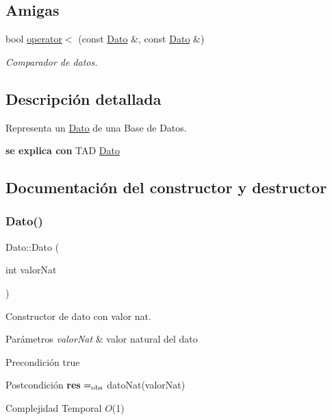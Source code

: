 \subsection*{Amigas}
\begin{DoxyCompactItemize}
\item 
\mbox{\label{classDato_a394289679728bdcb20171c43449894c1}} 
bool \mbox{\hyperlink{classDato_a394289679728bdcb20171c43449894c1}{operator$<$}} (const \mbox{\hyperlink{classDato}{Dato}} \&, const \mbox{\hyperlink{classDato}{Dato}} \&)
\begin{DoxyCompactList}\small\item\em Comparador de datos. \end{DoxyCompactList}\end{DoxyCompactItemize}


\subsection{Descripción detallada}
Representa un \mbox{\hyperlink{classDato}{Dato}} de una Base de Datos. 

{\bfseries se explica con} T\+AD \mbox{\hyperlink{classDato}{Dato}} 

\subsection{Documentación del constructor y destructor}
\mbox{\label{classDato_aeb115751623b17f5cc61199c45dd6fb4}} 
\subsubsection{\texorpdfstring{Dato()}{Dato()}\hspace{0.1cm}{\footnotesize\ttfamily [1/2]}}
{\footnotesize\ttfamily Dato\+::\+Dato (\begin{DoxyParamCaption}\item[{int}]{valor\+Nat }\end{DoxyParamCaption})}



Constructor de dato con valor nat. 


\begin{DoxyParams}{Parámetros}
{\em valor\+Nat} & valor natural del dato\\
\hline
\end{DoxyParams}
\begin{DoxyPrecond}{Precondición}
true 
\end{DoxyPrecond}
\begin{DoxyPostcond}{Postcondición}
{\bfseries res} $=_{\rm obs}$ dato\+Nat(valor\+Nat) 
\begin{DoxyDescription}
\item[Complejidad Temporal]$O$(1)
\end{DoxyDescription}
\end{DoxyPostcond}
\mbox{\label{classDato_a3b8e8b3472eee6374487378e865e3428}} 
